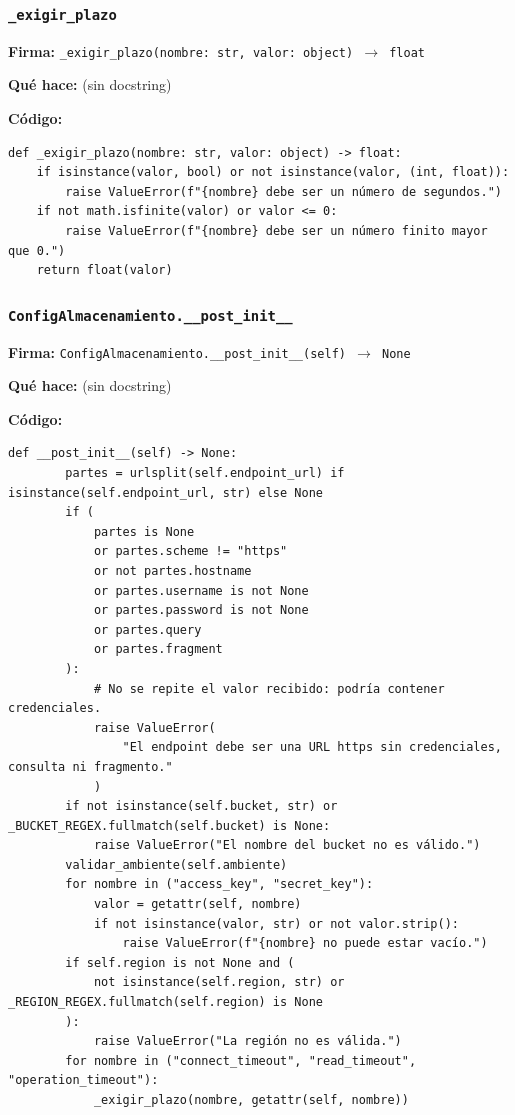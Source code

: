 \documentclass[11pt,a4paper]{article}
\begin{document}
\subsubsection*{\texttt{\_exigir\_plazo}}
\textbf{Firma:} \texttt{\_exigir\_plazo(nombre: str, valor: object) $\rightarrow$ float}

\textbf{Qué hace:} (sin docstring)

\textbf{Código:}
\begin{lstlisting}
def _exigir_plazo(nombre: str, valor: object) -> float:
    if isinstance(valor, bool) or not isinstance(valor, (int, float)):
        raise ValueError(f"{nombre} debe ser un número de segundos.")
    if not math.isfinite(valor) or valor <= 0:
        raise ValueError(f"{nombre} debe ser un número finito mayor que 0.")
    return float(valor)
\end{lstlisting}

\subsubsection*{\texttt{ConfigAlmacenamiento.\_\_post\_init\_\_}}
\textbf{Firma:} \texttt{ConfigAlmacenamiento.\_\_post\_init\_\_(self) $\rightarrow$ None}

\textbf{Qué hace:} (sin docstring)

\textbf{Código:}
\begin{lstlisting}
def __post_init__(self) -> None:
        partes = urlsplit(self.endpoint_url) if isinstance(self.endpoint_url, str) else None
        if (
            partes is None
            or partes.scheme != "https"
            or not partes.hostname
            or partes.username is not None
            or partes.password is not None
            or partes.query
            or partes.fragment
        ):
            # No se repite el valor recibido: podría contener credenciales.
            raise ValueError(
                "El endpoint debe ser una URL https sin credenciales, consulta ni fragmento."
            )
        if not isinstance(self.bucket, str) or _BUCKET_REGEX.fullmatch(self.bucket) is None:
            raise ValueError("El nombre del bucket no es válido.")
        validar_ambiente(self.ambiente)
        for nombre in ("access_key", "secret_key"):
            valor = getattr(self, nombre)
            if not isinstance(valor, str) or not valor.strip():
                raise ValueError(f"{nombre} no puede estar vacío.")
        if self.region is not None and (
            not isinstance(self.region, str) or _REGION_REGEX.fullmatch(self.region) is None
        ):
            raise ValueError("La región no es válida.")
        for nombre in ("connect_timeout", "read_timeout", "operation_timeout"):
            _exigir_plazo(nombre, getattr(self, nombre))
\end{lstlisting}
\end{document}
